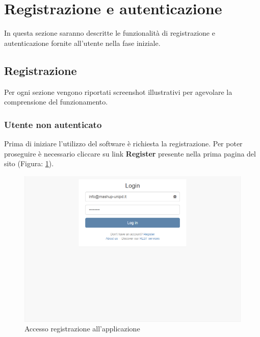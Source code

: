 %

\section{Registrazione e autenticazione} %
\label{sec:registrazione e autenticazione}
	In questa sezione saranno descritte le funzionalità di registrazione e autenticazione fornite all'utente nella fase iniziale.


	\subsection{Registrazione} %
	\label{sec:registrazione}
		Per ogni sezione vengono riportati screenshot illustrativi per agevolare la comprensione del funzionamento.


		\subsubsection{Utente non autenticato} %
		\label{sec:utente_non_autenticati}
			Prima di iniziare l'utilizzo del software \projectName{} è richiesta la registrazione.\newline
			Per poter proseguire è necessario cliccare su link \textbf{Register} presente nella prima pagina del sito (Figura: \ref{fig:registrazione_utente_accesso}).
			\begin{figure}[H]
				\centering
				\centerline{\includegraphics[width=14cm]{images/registrazione_utente_accesso.png}}
				\caption{Accesso registrazione all'applicazione}
				\label{fig:registrazione_utente_accesso}
			\end{figure}

